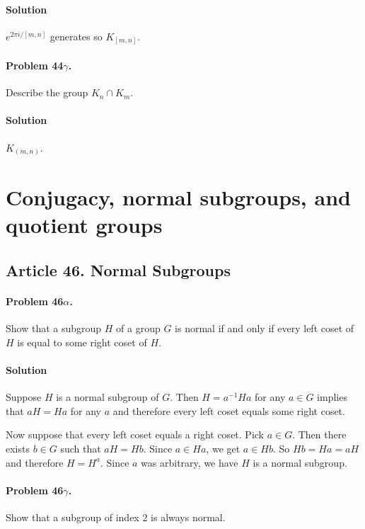 \paragraph*{Solution}
$e^{2\pi i / [m,n]}$ generates so $K_{[m,n]}$.

\paragraph{Problem 44$\gamma$.}
Describe the group $K_n \cap K_m$.

\paragraph*{Solution}
$K_{(m,n)}$.


\section{Conjugacy, normal subgroups, and quotient groups}


\subsection{Article 46. Normal Subgroups}

\paragraph{Problem 46$\alpha$.}
Show that a subgroup $H$ of a group $G$ is normal if and only if every left
coset of $H$ is equal to some right coset of $H$.

\paragraph*{Solution}
Suppose $H$ is a normal subgroup of $G$. Then $H = a^{-1}Ha$ for any $a \in G$
implies that $aH = Ha$ for any $a$ and therefore every left coset equals some
right coset.

Now suppose that every left coset equals a right coset. Pick $a \in G$. Then
there exists $b \in G$ such that $aH = Hb$. Since $a \in Ha$, we get $a \in Hb$.
So $Hb = Ha = aH$ and therefore $H = H^a$. Since $a$ was arbitrary, we have
$H$ is a normal subgroup.

\paragraph{Problem 46$\gamma$.}
Show that a subgroup of index 2 is always normal.

